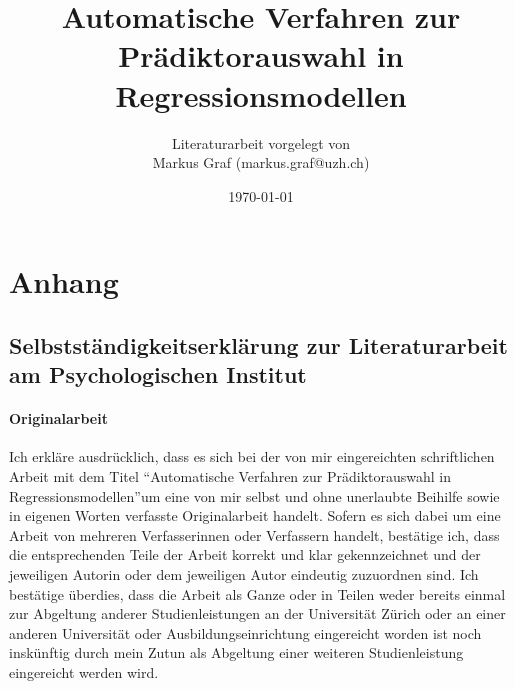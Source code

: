 \documentclass[german,12pt,doc]{apa}
\begin{document}
\title{Automatische Verfahren zur Prädiktorauswahl in Regressionsmodellen}
\author{Literaturarbeit vorgelegt von \\ Markus Graf (markus.graf@uzh.ch)}
\date{\today}
\maketitle
\setlength{\parindent}{0pt}
\newpage
\tableofcontents
\newpage











\newpage
\printglossaries 
\newpage
 

\newpage
\section{Anhang}
\subsection*{Selbstständigkeitserklärung zur Literaturarbeit am  Psychologischen Institut}
\paragraph{Originalarbeit}
Ich erkläre ausdrücklich, dass es sich bei der von mir eingereichten schriftlichen Arbeit 
mit dem Titel ``Automatische Verfahren zur Prädiktorauswahl in Regressionsmodellen''um eine von mir selbst und ohne unerlaubte Beihilfe sowie in eigenen Worten verfasste 
Originalarbeit handelt. 
Sofern es sich dabei um eine Arbeit von mehreren Verfasserinnen oder Verfassern handelt, bestätige ich, dass die entsprechenden Teile der Arbeit korrekt und klar gekennzeichnet und der jeweiligen Autorin oder dem jeweiligen Autor eindeutig zuzuordnen sind.
Ich bestätige überdies, dass die Arbeit als Ganze oder in Teilen weder bereits einmal zur Abgeltung anderer Studienleistungen an der Universität Zürich oder an einer anderen Universität oder Ausbildungseinrichtung eingereicht worden ist noch inskünftig durch mein Zutun als Abgeltung einer weiteren Studienleistung eingereicht werden wird.  
\end{document}
